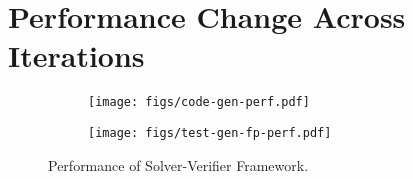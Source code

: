 \section{Performance Change Across Iterations}
\label{app:performance-change}
\begin{figure*}[ht]
    \centering
    \begin{subfigure}[b]{0.4\textwidth}
        \centering
        \texttt{[image: figs/code-gen-perf.pdf]}
    \end{subfigure}
    \begin{subfigure}[b]{0.4\textwidth}
        \centering
        \texttt{[image: figs/test-gen-fp-perf.pdf]}
    \end{subfigure}
    \caption{Performance of Solver-Verifier Framework.}
    \label{fig:solver-verifier-perf}
\end{figure*}